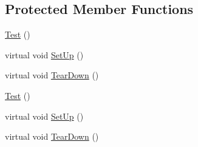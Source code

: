 \subsection*{\-Protected \-Member \-Functions}
\begin{DoxyCompactItemize}
\item 
\hyperlink{classtesting_1_1Test_a350e5417b9f48c2f7b98937514b03da2}{\-Test} ()
\item 
virtual void \hyperlink{classtesting_1_1Test_a1b06560e0e01a806b92c2386220d0b57}{\-Set\-Up} ()
\item 
virtual void \hyperlink{classtesting_1_1Test_a931587596081ef8178c2b128facb0411}{\-Tear\-Down} ()
\item 
\hyperlink{classtesting_1_1Test_a350e5417b9f48c2f7b98937514b03da2}{\-Test} ()
\item 
virtual void \hyperlink{classtesting_1_1Test_a901706a587f9ae84df8b2395fbe759cb}{\-Set\-Up} ()
\item 
virtual void \hyperlink{classtesting_1_1Test_a870a092058305911f3d42df45dd657e5}{\-Tear\-Down} ()
\end{DoxyCompactItemize}
